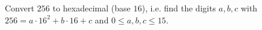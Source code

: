 Convert $256$ to hexadecimal (base $16$), i.e. find the digits $a,b,c$ with $256=a\cdot16^2+b\cdot16+c$ and $0\le a,b,c\le15$.
